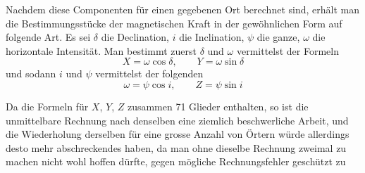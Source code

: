 Nachdem diese Componenten für einen gegebenen Ort berechnet sind, erhält man die Bestimmungsstücke der magnetischen Kraft in der gewöhnlichen Form auf folgende Art. Es sei $\delta$ die Declination, $i$ die Inclination, $\psi$ die ganze, $\omega$ die horizontale Intensität. Man bestimmt zuerst $\delta$ und $\omega$ vermittelst der Formeln
\[
X=\omega\cos\delta,\qquad Y=\omega\sin\delta
\]
und sodann $i$ und $\psi$ vermittelst der folgenden
\[
\omega=\psi\cos i,\qquad Z=\psi\sin i
\]

Da die Formeln für $X$, $Y$, $Z$ zusammen 71 Glieder enthalten, so ist die unmittelbare Rechnung nach denselben eine ziemlich beschwerliche Arbeit, und die Wiederholung derselben für eine grosse Anzahl von Örtern würde allerdings desto mehr abschreckendes haben, da man ohne dieselbe Rechnung zweimal zu machen nicht wohl hoffen dürfte, gegen mögliche Rechnungsfehler geschützt zu
